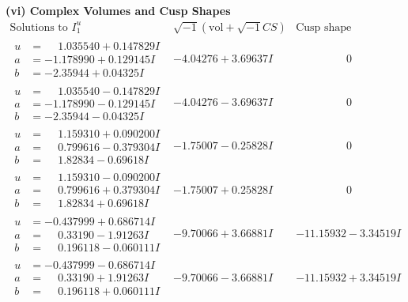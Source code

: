 \documentclass[1p]{elsarticle_modified}
\theoremstyle{definition}
\newcommand{\I}{\sqrt{-1}}
\begin{document}
\newpage\flushleft \textbf{(vi) Complex Volumes and Cusp Shapes}
$$\begin{array}{c|c|c}  
\text{Solutions to }I^u_{1}& \I (\text{vol} + \sqrt{-1}CS) & \text{Cusp shape}\\
 \hline 
\begin{aligned}
u &= \phantom{-}1.035540 + 0.147829 I \\
a &= -1.178990 + 0.129145 I \\
b &= -2.35944 + 0.04325 I\end{aligned}
 & -4.04276 + 3.69637 I & \phantom{-0.000000 } 0 \\ \hline\begin{aligned}
u &= \phantom{-}1.035540 - 0.147829 I \\
a &= -1.178990 - 0.129145 I \\
b &= -2.35944 - 0.04325 I\end{aligned}
 & -4.04276 - 3.69637 I & \phantom{-0.000000 } 0 \\ \hline\begin{aligned}
u &= \phantom{-}1.159310 + 0.090200 I \\
a &= \phantom{-}0.799616 - 0.379304 I \\
b &= \phantom{-}1.82834 - 0.69618 I\end{aligned}
 & -1.75007 - 0.25828 I & \phantom{-0.000000 } 0 \\ \hline\begin{aligned}
u &= \phantom{-}1.159310 - 0.090200 I \\
a &= \phantom{-}0.799616 + 0.379304 I \\
b &= \phantom{-}1.82834 + 0.69618 I\end{aligned}
 & -1.75007 + 0.25828 I & \phantom{-0.000000 } 0 \\ \hline\begin{aligned}
u &= -0.437999 + 0.686714 I \\
a &= \phantom{-}0.33190 - 1.91263 I \\
b &= \phantom{-}0.196118 - 0.060111 I\end{aligned}
 & -9.70066 + 3.66881 I & -11.15932 - 3.34519 I \\ \hline\begin{aligned}
u &= -0.437999 - 0.686714 I \\
a &= \phantom{-}0.33190 + 1.91263 I \\
b &= \phantom{-}0.196118 + 0.060111 I\end{aligned}
 & -9.70066 - 3.66881 I & -11.15932 + 3.34519 I \\ \hline\begin{aligned}

\end{aligned}
\end{array}$$
\end{document}
